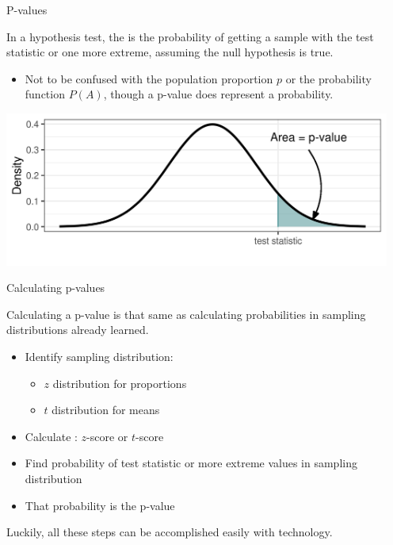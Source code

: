 \documentclass[xcolor=table, aspectratio=169, bigger]{beamer}
\begin{document}
\begin{frame}{P-values}
\begin{block}{}
In a hypothesis test, the  is the probability of getting a sample with the test statistic or one more extreme, assuming the null hypothesis is true.
\begin{itemize}
\item Not to be confused with the population proportion $p$ or the probability function $P(A)$, though a p-value does represent a probability.
\end{itemize} 
\end{block}
\bigskip
{\centering
\includegraphics[width=5in]{../images/wk08_pvalue}
\par}

\end{frame}

\begin{frame}{Calculating p-values}
\begin{block}{}
Calculating a p-value is that same as calculating probabilities in sampling distributions already learned.
\begin{itemize}
\pause\item Identify sampling distribution: 
\begin{itemize}
\item $z$ distribution for proportions
\item $t$ distribution for means
\end{itemize}
\pause\item Calculate : $z$-score or $t$-score
\pause\item Find probability of test statistic or more extreme values in sampling distribution
\pause\item That probability is the p-value
\end{itemize}
\end{block}

\begin{block}{}
Luckily, all these steps can be accomplished easily with technology.
\end{block}
\end{frame}
\end{document}
